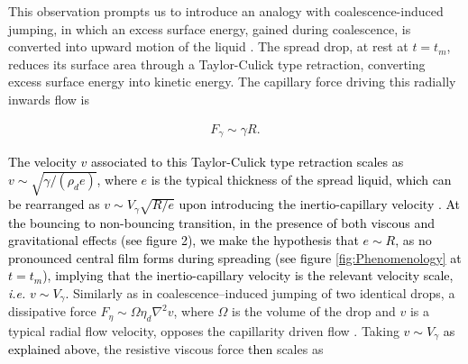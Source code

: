 \documentclass{jfm}
\newcommand{\Ohn}{\mathit{Oh}}
\newcommand{\Wen}{\mathit{We}}
\newcommand{\revRev}[1]{\textcolor{black}{#1}}
\begin{document}
This observation prompts us to introduce an analogy with coalescence-induced jumping, in which an excess surface energy, gained during coalescence, is converted into upward motion of the liquid \citep{boreyko2009, liu2014numerical, farokhirad2015coalescence}. The spread drop, at rest at $t=t_m$, reduces its surface area through a Taylor-Culick type retraction, converting excess surface energy into kinetic energy.
The capillary force driving this radially inwards flow is

\begin{align}
	\label{eq:drivingCapillary}
	F_\gamma \sim \gamma R.
\end{align}

\noindent \revRev{The velocity $v$ associated to this Taylor-Culick type retraction scales as $v \sim \sqrt{\gamma/\left(\rho_d e\right)}$, where $e$ is the typical thickness of the spread liquid, which can be rearranged as $v \sim V_\gamma \sqrt{R/e}$ upon introducing the inertio-capillary velocity \citep{bartolo2005retraction,chantelot2018rebonds}.
At the bouncing to non-bouncing transition, in the presence of both viscous and gravitational effects (see figure 2), we make the hypothesis that $e \sim R$, as no pronounced central film forms during spreading (see figure \ref{fig:Phenomenology} at $t=t_m$), implying that the inertio-capillary velocity is the relevant velocity scale, \emph{i.e.} $v \sim V_\gamma$.}
Similarly as in coalescence--induced jumping of two identical drops, a dissipative force $F_\eta \sim \Omega\eta_d\nabla^2v$, where $\Omega$ is the volume of the drop and $v$ is a typical radial flow velocity, opposes the capillarity driven flow \citep{mouterde2017merging, lecointre2019ballistics}.
Taking \revRev{$v \sim V_\gamma$ as explained above}, the resistive viscous force \revRev{then} scales as
\end{document}
